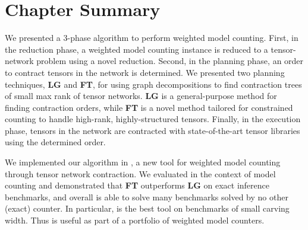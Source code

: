 \section{Chapter Summary} \label{sec:tensors:conclusion}
We presented a 3-phase algorithm to perform weighted model counting. First, in the reduction phase, a weighted model counting instance is reduced to a tensor-network problem using a novel reduction. Second, in the planning phase, an order to contract tensors in the network is determined. We presented two planning techniques, \textbf{LG} and \textbf{FT}, for using graph decompositions to find contraction trees of small max rank of tensor networks. \textbf{LG} is a general-purpose method for finding contraction orders, while \textbf{FT} is a novel method tailored for constrained counting to handle high-rank, highly-structured tensors. Finally, in the execution phase, tensors in the network are contracted with state-of-the-art tensor libraries using the determined order.


We implemented our algorithm in , a new tool for weighted model counting through tensor network contraction.
We evaluated  in the context of model counting and demonstrated that \textbf{FT} outperforms \textbf{LG} on exact inference benchmarks, and overall  is able to solve many benchmarks solved by no other (exact) counter.
In particular,  is the best tool on benchmarks of small carving width.
Thus  is useful as part of a portfolio of weighted model counters.


